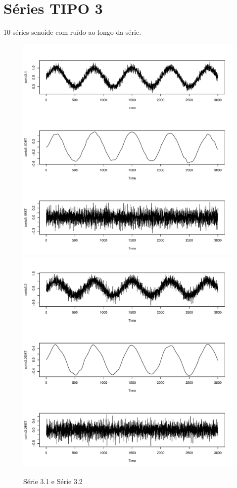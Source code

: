 \section{Séries TIPO 3}
10 séries senoide com ruído ao longo da série.
\graphicspath{{imagens/}}
\begin{figure}[H]
\begin{center}
  \includegraphics[scale=0.43]{serie3_1.pdf} \quad
  \includegraphics[scale=0.43]{serie3_2.pdf}
  \caption{Série 3.1 e Série 3.2}

\end{center}
\end{figure}

